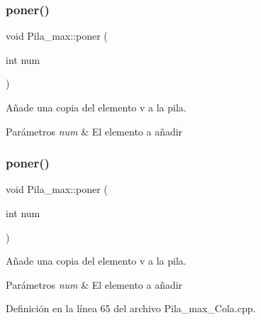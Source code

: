 \subsubsection{\texorpdfstring{poner()}{poner()}\hspace{0.1cm}{\footnotesize\ttfamily [1/2]}}
{\footnotesize\ttfamily void Pila\+\_\+max\+::poner (\begin{DoxyParamCaption}\item[{int}]{num }\end{DoxyParamCaption})}



Añade una copia del elemento v a la pila. 


\begin{DoxyParams}{Parámetros}
{\em num} & El elemento a añadir \\
\hline
\end{DoxyParams}
\mbox{\label{classPila__max_acb56642abe72ba171668295fe04202e1}} 
\subsubsection{\texorpdfstring{poner()}{poner()}\hspace{0.1cm}{\footnotesize\ttfamily [2/2]}}
{\footnotesize\ttfamily void Pila\+\_\+max\+::poner (\begin{DoxyParamCaption}\item[{int}]{num }\end{DoxyParamCaption})}



Añade una copia del elemento v a la pila. 


\begin{DoxyParams}{Parámetros}
{\em num} & El elemento a añadir \\
\hline
\end{DoxyParams}


Definición en la línea 65 del archivo Pila\+\_\+max\+\_\+\+Cola.\+cpp.



